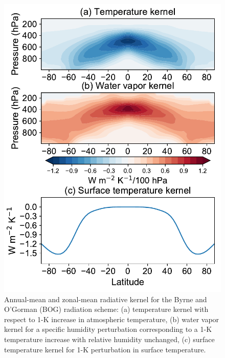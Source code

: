 \begin{figure}[ht]
	\centering
	\includegraphics[width=0.45\linewidth]{figs/polar_amp/kernels_byrne}
	\caption[Annual-mean and zonal-mean temperature, water vapor and surface temperature radiative kernels for the BOG radiation scheme]{Annual-mean and zonal-mean radiative kernel for the Byrne and O'Gorman (BOG) radiation scheme: (a) temperature kernel with respect to 1-K increase in atmospheric temperature, (b) water vapor kernel for a specific humidity perturbation corresponding to a 1-K temperature increase with relative humidity unchanged, (c) surface temperature kernel for 1-K perturbation in surface temperature.}
	\label{fig:bog_kernels}
\end{figure}



